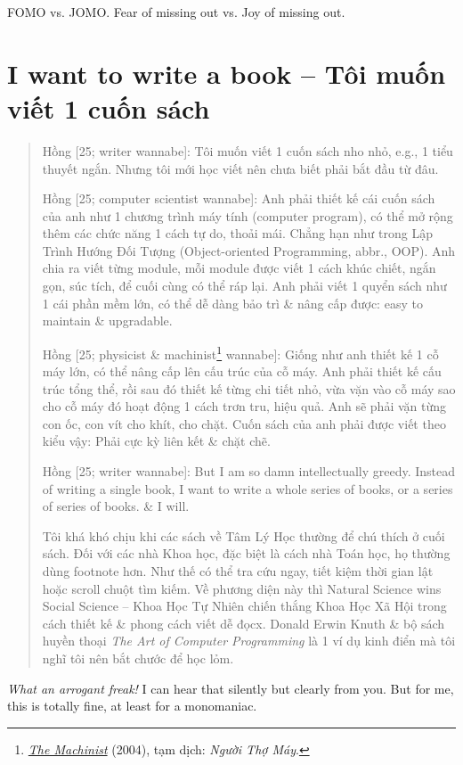 \documentclass[12pt,oneside]{book}
\begin{document}
FOMO vs. JOMO. Fear of missing out vs. Joy of missing out.

\section{I want to write a book -- Tôi muốn viết 1 cuốn sách}

\begin{quote}
	{\sf Hồng [25; writer wannabe]}: Tôi muốn viết 1 cuốn sách nho nhỏ, e.g., 1 tiểu thuyết ngắn. Nhưng tôi mới học viết nên chưa biết phải bắt đầu từ đâu.
	
	{\sf Hồng [25; computer scientist wannabe]}: Anh phải thiết kế cái cuốn sách của anh như 1 chương trình máy tính (computer program), có thể mở rộng thêm các chức năng 1 cách tự do, thoải mái. Chẳng hạn như trong Lập Trình Hướng Đối Tượng (Object-oriented Programming, abbr., OOP). Anh chia ra viết từng module, mỗi module được viết 1 cách khúc chiết, ngắn gọn, súc tích, để cuối cùng có thể ráp lại. Anh phải viết 1 quyển sách như 1 cái phần mềm lớn, có thể dễ dàng bảo trì \& nâng cấp được: easy to maintain \& upgradable.
	
	{\sf Hồng [25; physicist \& machinist\footnote{\href{https://www.imdb.com/title/tt0361862/}{\it The Machinist} (2004), tạm dịch: {\it Người Thợ Máy}.} wannabe]}: Giống như anh thiết kế 1 cỗ máy lớn, có thể nâng cấp lên cấu trúc của cỗ máy. Anh phải thiết kế cấu trúc tổng thể, rồi sau đó thiết kế từng chi tiết nhỏ, vừa vặn vào cỗ máy sao cho cỗ máy đó hoạt động 1 cách trơn tru, hiệu quả. Anh sẽ phải vặn từng con ốc, con vít cho khít, cho chặt. Cuốn sách của anh phải được viết theo kiểu vậy: Phải cực kỳ liên kết \& chặt chẽ.
	
	{\sf Hồng [25; writer wannabe]}: But I am so damn intellectually greedy. Instead of writing a single book, I want to write a whole series of books, or a series of series of books. \& I will.
	
	Tôi khá khó chịu khi các sách về Tâm Lý Học thường để chú thích ở cuối sách. Đối với các nhà Khoa học, đặc biệt là cách nhà Toán học, họ thường dùng footnote hơn. Như thế có thể tra cứu ngay, tiết kiệm thời gian lật hoặc scroll chuột tìm kiếm. Về phương diện này thì Natural Science wins Social Science -- Khoa Học Tự Nhiên chiến thắng Khoa Học Xã Hội trong cách thiết kế \& phong cách viết dễ đọcx. {\sc Donald Erwin Knuth} \& bộ sách huyền thoại {\it The Art of Computer Programming} \cite{Knuth1997,Knuth1998} là 1 ví dụ kinh điển mà tôi nghĩ tôi nên bắt chước để học lỏm.
\end{quote}
{\it What an arrogant freak!} I can hear that silently but clearly from you. But for me, this is totally fine, at least for a monomaniac.
\end{document}
